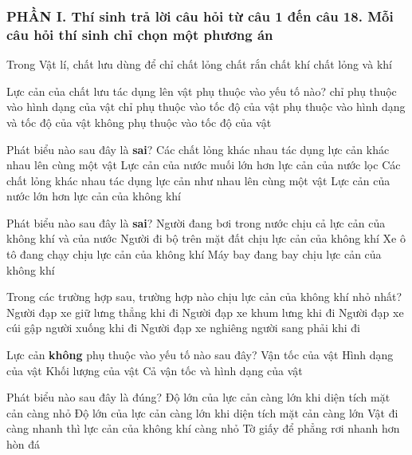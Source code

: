 \subsubsection*{PHẦN I. Thí sinh trả lời câu hỏi từ câu 1 đến câu 18. Mỗi câu hỏi thí sinh chỉ chọn một phương án}
\setcounter{ex}{0}
\begin{ex}%
Trong Vật lí, chất lưu dùng để chỉ
\choice
{chất lỏng}
{chất rắn}
{chất khí}
{\True chất lỏng và khí}
\loigiai{}
 \end{ex}
\begin{ex}%
Lực cản của chất lưu tác dụng lên vật phụ thuộc vào yếu tố nào?
\choice
{chỉ phụ thuộc vào hình dạng của vật}
{chỉ phụ thuộc vào tốc độ của vật}
{\True phụ thuộc vào hình dạng và tốc độ của vật}
{không phụ thuộc vào tốc độ của vật}
 \end{ex}
\begin{ex}%
Phát biểu nào sau đây là \textbf{sai}?
\choice
{Các chất lỏng khác nhau tác dụng lực cản khác nhau lên cùng một vật}
{Lực cản của nước muối lớn hơn lực cản của nước lọc}
{\True Các chất lỏng khác nhau tác dụng lực cản như nhau lên cùng một vật}
{Lực cản của nước lớn hơn lực cản của không khí}
\loigiai{}
 \end{ex}
\begin{ex}%
Phát biểu nào sau đây là \textbf{sai}?
\choice
{\True Người đang bơi trong nước chịu cả lực cản của không khí và của nước}
{Người đi bộ trên mặt đất chịu lực cản của không khí}
{Xe ô tô đang chạy chịu lực cản của không khí}
{Máy bay đang bay chịu lực cản của không khí}
\loigiai{}
 \end{ex}
\begin{ex}%
Trong các trường hợp sau, trường hợp nào chịu lực cản của không khí nhỏ nhất?
\choice
{Người đạp xe giữ lưng thẳng khi đi}
{Người đạp xe khum lưng khi đi}
{\True Người đạp xe cúi gập người xuống khi đi}
{Người đạp xe nghiêng người sang phải khi đi}
\loigiai{}
 \end{ex}
\begin{ex}%
Lực cản \textbf{không} phụ thuộc vào yếu tố nào sau đây?
\choice
{Vận tốc của vật}
{Hình dạng của vật}
{\True Khối lượng của vật}
{Cả vận tốc và hình dạng của vật}
\loigiai{	}
\end{ex}
\begin{ex}%
Phát biểu nào sau đây là đúng?
\choice
{Độ lớn của lực cản càng lớn khi diện tích mặt cản càng nhỏ}
{\True Độ lớn của lực cản càng lớn khi diện tích mặt cản càng lớn}
{Vật đi càng nhanh thì lực cản của không khí càng nhỏ}
{Tờ giấy để phẳng rơi nhanh hơn hòn đá}
\loigiai{}
 \end{ex}

